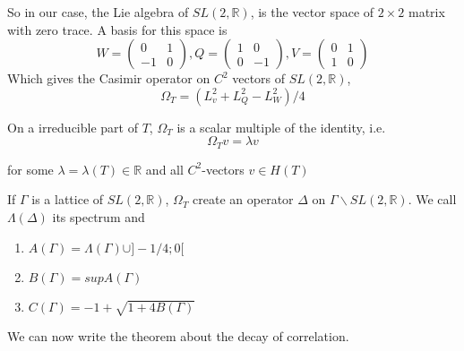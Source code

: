 So in our case, the Lie algebra of $SL(2,\mathbb{R})$, is the vector space of $2 \times 2$ matrix with zero trace. A basis for this space is \[
W=\begin{pmatrix} 0 & 1 \\ -1 & 0 \end{pmatrix}, Q=\begin{pmatrix} 1 & 0 \\ 0 & -1 \end{pmatrix}, V=\begin{pmatrix} 0 & 1 \\ 1 & 0 \end{pmatrix}
\]
Which gives the Casimir operator on $C^2$ vectors of $SL(2,\mathbb{R})$, \[
\Omega_T = (L_v^2+L_Q^2-L_W^2)/4
\]

On a irreducible part of $T$, $\Omega_T$ is a scalar multiple of the identity, i.e. \[
\Omega_T v = \lambda v
\]

for some $\lambda=\lambda(T)\in \mathbb{R}$ and all $C^2$-vectors $v \in H(T)$

If $\Gamma$ is a lattice of $SL(2,\mathbb{R})$, $\Omega_T$ create an operator $\Delta$ on $\Gamma \backslash SL(2,\mathbb{R})$. We call $\Lambda(\Delta)$ its spectrum and
\begin{enumerate}
\item $A(\Gamma)=\Lambda(\Gamma) \cup ]-1/4;0[$
\item $B(\Gamma)=sup A(\Gamma)$
\item $C(\Gamma)= -1 + \sqrt{1+4 B(\Gamma)}$
\end{enumerate}

We can now write the theorem about the decay of correlation.

